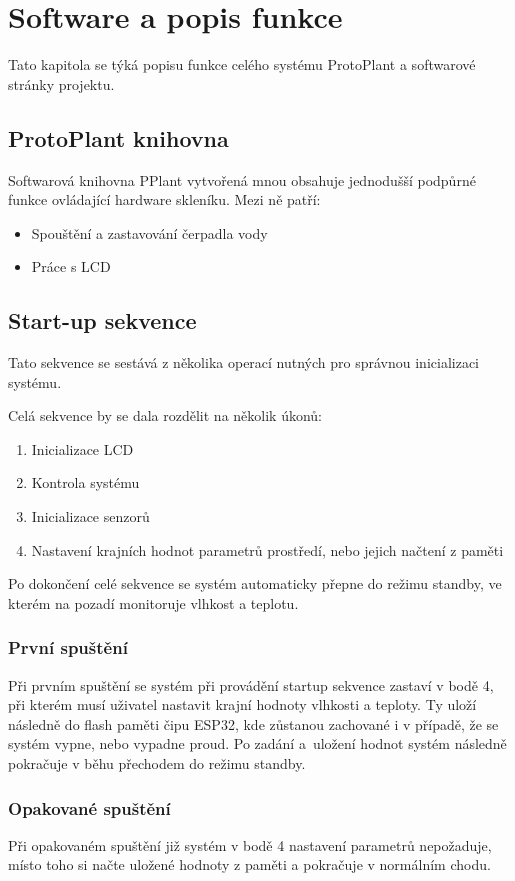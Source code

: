 \chapter{Software a popis funkce}
Tato kapitola se týká popisu funkce celého systému ProtoPlant a softwarové stránky projektu.

\section{ProtoPlant knihovna}
Softwarová knihovna PPlant vytvořená mnou obsahuje jednodušší podpůrné funkce ovládající hardware skleníku.
Mezi ně patří:
\begin{itemize}
    \item Spouštění a zastavování čerpadla vody
    \item Práce s LCD
\end{itemize}

\section{Start-up sekvence}
Tato sekvence se sestává z několika operací nutných pro správnou inicializaci systému.

Celá sekvence by se dala rozdělit na několik úkonů:
\begin{enumerate}
    \item Inicializace LCD
    \item Kontrola systému
    \item Inicializace senzorů
    \item Nastavení krajních hodnot parametrů prostředí, nebo jejich načtení z paměti
\end{enumerate}
Po dokončení celé sekvence se systém automaticky přepne do režimu standby, ve kterém na pozadí monitoruje vlhkost a teplotu.

\subsection{První spuštění}
Při prvním spuštění se systém při provádění startup sekvence zastaví v bodě 4, při kterém musí uživatel nastavit krajní hodnoty vlhkosti a teploty.
Ty uloží následně do flash paměti čipu ESP32, kde zůstanou zachované i v případě, že se systém vypne, nebo vypadne proud.
Po zadání a~uložení hodnot systém následně pokračuje v běhu přechodem do režimu standby.

\subsection{Opakované spuštění}
Při opakovaném spuštění již systém v bodě 4 nastavení parametrů nepožaduje, místo toho si načte uložené hodnoty z paměti a pokračuje v normálním chodu.

